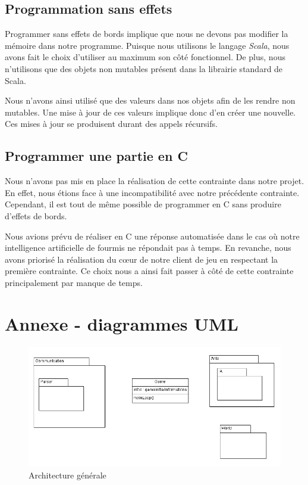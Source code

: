 \documentclass[11pt,a4paper]{article}
\begin{document}
\subsection{Programmation sans effets}

Programmer sans effets de bords implique que nous ne devons pas modifier la mémoire dans notre programme. Puisque nous utilisons le langage \emph{Scala}, nous avons fait le choix d'utiliser au maximum son côté fonctionnel. De plus, nous n'utilisons que des objets non mutables présent dans la librairie standard de Scala.\newline

Nous n'avons ainsi utilisé que des valeurs dans nos objets afin de les rendre non mutables. Une mise à jour de ces valeurs implique donc d'en créer une nouvelle. Ces mises à jour se produisent durant des appels récursifs.

\subsection{Programmer une partie en C}

Nous n'avons pas mis en place la réalisation de cette contrainte dans notre projet. En effet, nous étions face à une incompatibilité avec notre précédente contrainte. Cependant, il est tout de même possible de programmer en C sans produire d'effets de bords.\newline

Nous avions prévu de réaliser en C une réponse automatisée dans le cas où notre intelligence artificielle de fourmis ne répondait pas à temps. En revanche, nous avons priorisé la réalisation du cœur de notre client de jeu en respectant la première contrainte. Ce choix nous a ainsi fait passer à côté de cette contrainte principalement par manque de temps.

\section{Annexe - diagrammes UML}

\begin{figure}
  \includegraphics[width=\textwidth]{global.png}
  \caption{Architecture générale}
\end{figure}
\end{document}

